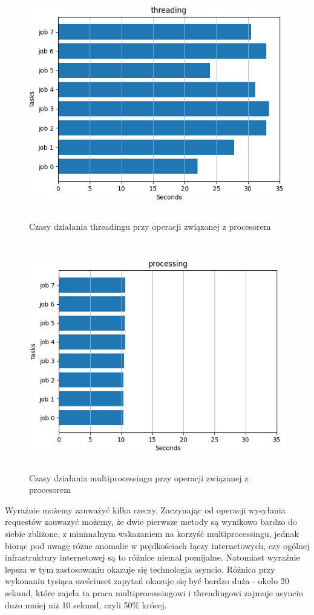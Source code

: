 \begin{figure}[H]
    \includegraphics[height=100mm]{zdjecia/threading_cpu}
    \caption{Czasy działania threadingu przy operacji związanej z procesorem}
\end{figure}

\begin{figure}[H]
    \includegraphics[height=100mm]{zdjecia/processing_cpu}
    \caption{Czasy działania multiprocessingu przy operacji związanej z procesorem}
\end{figure}

Wyraźnie możemy zauważyć kilka rzeczy. Zaczynając od operacji wysyłania requestów zauwazyć możemy, że dwie pierwsze metody są wynikowo bardzo do siebie zbliżone, z minimalnym wskazaniem na korzyść multiprocessingu, jednak biorąc pod uwagę różne anomalie w prędkościach łączy internetowych, czy ogólnej infrastruktury internetowej są to różnice niemal pomijalne. Natomiast wyraźnie lepsza w tym zastosowaniu okazuje się technologia asyncio. Różnica przy wykonaniu tysiąca sześciuset zapytań okazuje się być bardzo duża - około 20 sekund, które zajeła ta praca multiprocessingowi i threadingowi zajmuje asyncio dużo mniej niż 10 sekund, czyli 50\% krócej.

